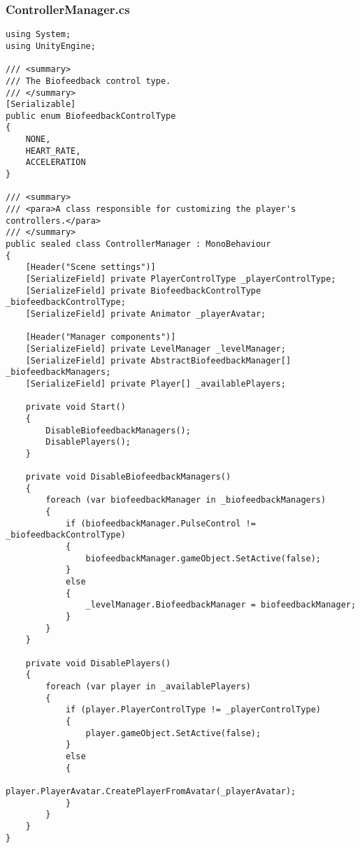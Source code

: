 \subsubsection*{ControllerManager.cs}
\begin{verbatim}
using System;
using UnityEngine;

/// <summary>
/// The Biofeedback control type.
/// </summary>
[Serializable]
public enum BiofeedbackControlType
{
    NONE,
    HEART_RATE,
    ACCELERATION
}

/// <summary>
/// <para>A class responsible for customizing the player's controllers.</para>
/// </summary>
public sealed class ControllerManager : MonoBehaviour
{
    [Header("Scene settings")] 
    [SerializeField] private PlayerControlType _playerControlType;
    [SerializeField] private BiofeedbackControlType _biofeedbackControlType;
    [SerializeField] private Animator _playerAvatar;

    [Header("Manager components")]
    [SerializeField] private LevelManager _levelManager;
    [SerializeField] private AbstractBiofeedbackManager[] _biofeedbackManagers;
    [SerializeField] private Player[] _availablePlayers;

    private void Start()
    {
        DisableBiofeedbackManagers();
        DisablePlayers();
    }

    private void DisableBiofeedbackManagers()
    {
        foreach (var biofeedbackManager in _biofeedbackManagers)
        {
            if (biofeedbackManager.PulseControl != _biofeedbackControlType)
            {
                biofeedbackManager.gameObject.SetActive(false);
            }
            else
            {
                _levelManager.BiofeedbackManager = biofeedbackManager;
            }
        }
    }

    private void DisablePlayers()
    {
        foreach (var player in _availablePlayers)
        {
            if (player.PlayerControlType != _playerControlType)
            {
                player.gameObject.SetActive(false);
            }
            else
            {
                player.PlayerAvatar.CreatePlayerFromAvatar(_playerAvatar);
            }
        }
    }
}
\end{verbatim}
